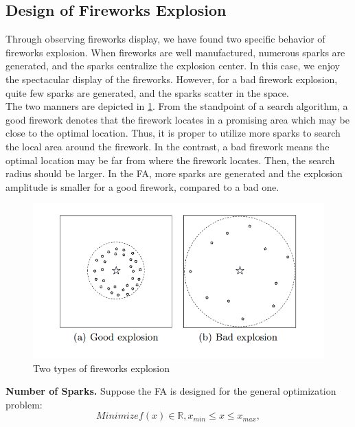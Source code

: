 \documentclass[11pt, a4paper]{report}
\begin{document}
\subsection{Design of Fireworks Explosion}
Through observing fireworks display, we have found two specific behavior of
fireworks explosion. When fireworks are well manufactured, numerous sparks are
generated, and the sparks centralize the explosion center. In this case, we enjoy
the spectacular display of the fireworks. However, for a bad firework explosion,
quite few sparks are generated, and the sparks scatter in the space. \\

The two manners are depicted in \ref{fig:FWAtypesofexplosion}. From the standpoint of a search
algorithm, a good firework denotes that the firework locates in a promising area
which may be close to the optimal location. Thus, it is proper to utilize more
sparks to search the local area around the firework. In the contrast, a bad firework
means the optimal location may be far from where the firework locates. Then,
the search radius should be larger. In the FA, more sparks are generated and
the explosion amplitude is smaller for a good firework, compared to a bad one.

	\begin{figure}[!bth]
	\center
	\includegraphics[scale=0.5]{images/typesOfFireworksExplosion.png}
	\caption[Two types of fireworks explosion]{Two types of fireworks explosion \cite{paper:fwa}}
	\label{fig:FWAtypesofexplosion}
\end{figure}

\newpage

\textbf{Number of Sparks.} Suppose the FA is designed for the general optimization
problem:
	\begin{equation}
	\label{eq:minimizefx}
	 Minimize f(x) \in \mathbb{R}, x_{min} \leq x \leq x_{max} ,
	\end{equation}
	
\end{document}
